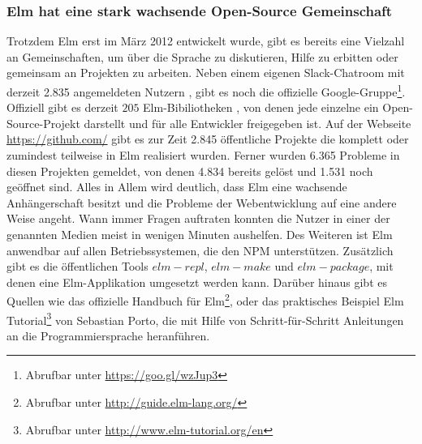 \subsubsection{Elm hat eine stark wachsende Open-Source Gemeinschaft}
Trotzdem Elm erst im März 2012 entwickelt wurde, gibt es bereits eine Vielzahl an Gemeinschaften, um über die Sprache zu diskutieren, Hilfe zu erbitten oder gemeinsam an Projekten zu arbeiten. Neben einem eigenen Slack-Chatroom mit derzeit 2.835 angemeldeten Nutzern \cite[Vgl.]{slack-user}, gibt es noch die offizielle Google-Gruppe\footnote{Abrufbar unter  \url{https://goo.gl/wzJup3}}. Offiziell gibt es derzeit $205$ Elm-Bibiliotheken \cite[Vgl.]{elm-package}, von denen jede einzelne ein Open-Source-Projekt darstellt und für alle Entwickler freigegeben ist. Auf der Webseite \url{https://github.com/} gibt es zur Zeit 2.845 öffentliche Projekte \cite[Vgl.]{elm-repositories} die komplett oder zumindest teilweise in Elm realisiert wurden. Ferner wurden 6.365 Probleme in diesen Projekten gemeldet, von denen 4.834 bereits gelöst und 1.531 noch geöffnet sind\cite[Vgl.]{elm-github-issues}.  Alles in Allem wird deutlich, dass Elm eine wachsende Anhängerschaft besitzt und die Probleme der Webentwicklung auf eine andere Weise angeht. Wann immer Fragen auftraten konnten die Nutzer in einer der genannten Medien meist in wenigen Minuten aushelfen. Des Weiteren ist Elm anwendbar auf allen Betriebssystemen, die den \ac{NPM} unterstützen. Zusätzlich gibt es die öffentlichen Tools $elm-repl$, $elm-make$ und $elm-package$, mit denen eine Elm-Applikation umgesetzt werden kann. Darüber hinaus gibt es Quellen wie das offizielle Handbuch für Elm\footnote{Abrufbar unter \url{http://guide.elm-lang.org/}}, oder das praktisches Beispiel \glqq Elm Tutorial\grqq\cite{elm-tutorial}\footnote{Abrufbar unter \url{http://www.elm-tutorial.org/en}} von Sebastian Porto, die mit Hilfe von Schritt-für-Schritt Anleitungen an die Programmiersprache heranführen.


